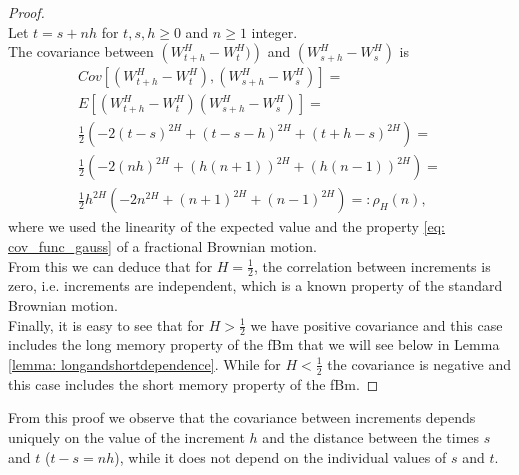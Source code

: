 \documentclass[a4paper,italian,11pt]{book}
\theoremstyle{plain}
\theoremstyle{remark}
\theoremstyle{plain}
\begin{document}
\begin{proof}
\\

\noindent
Let $t=s+nh$ for $t,s,h\ge 0$ and $n\ge 1$ integer. \\
The covariance between $ \left( W^H_{t+h}-W^H_t) \right)$ and $\left( W^H_{s+h}-W^H_s \right)$ is
\\

\noindent
\begin{equation}
    \label{eq: correlationW}
    \begin{gathered}
    Cov[\left( W^H_{t+h}-W^H_t \right), \left( W^H_{s+h}-W^H_s \right)] =\\
    E[(W^H_{t+h}-W^H_t)(W^H_{s+h}-W^H_s)] =\\
    \frac{1}{2}\left(-2(t-s)^{2H}+(t-s-h)^{2H} +(t+h-s)^{2H}\right)=\\
    \frac{1}{2}\left(-2(nh)^{2H}+(h(n+1))^{2H}+(h(n-1))^{2H}\right)=\\
    \frac{1}{2}h^{2H}\left(-2n^{2H}+(n+1)^{2H}+(n-1)^{2H}\right) =: \rho_H(n),
    \end{gathered}
\end{equation}
where we used the linearity of the expected value and the property \eqref{eq: cov_func_gauss}
of a fractional Brownian motion. 
\\
From this we can deduce that for $H=\frac{1}{2}$, the correlation between increments is zero, i.e. increments are independent, which is a known property of the standard Brownian motion. \\
Finally, it is easy to see that for $H>\frac{1}{2}$ we have positive covariance and this case includes the long memory property of the fBm that we will see below in Lemma \ref{lemma: longandshortdependence}. While for $H<\frac{1}{2}$ the covariance is negative and this case includes the short memory property of the fBm.

\end{proof}

From this proof we observe that the covariance between increments depends uniquely on the value of the increment $h$ and the distance between the times $s$ and $t$ ($t-s = nh$), while it does not depend on the individual values of $s$ and $t$.
\\
\end{document}
